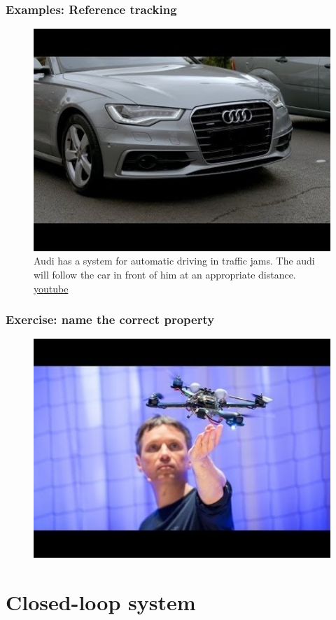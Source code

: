 \begin{frame}
	\frametitle{Examples: Reference tracking}
	\begin{figure}
\centering
\includegraphics[width=0.7\linewidth]{audi-tracking}
\caption{Audi has a system for automatic driving in traffic jams. The audi will follow the car in front of him at an appropriate distance. \href{https://www.youtube.com/watch?v=Qa_ZSRj0WM0}{youtube}}
\label{fig:audi-tracking}
\end{figure}
\end{frame}

\begin{frame}
	\frametitle{Exercise: name the correct property}
	\begin{figure}
\centering
\includegraphics[width=0.7\linewidth]{ted-drone}
\label{fig:ted-drone}
\end{figure}

\end{frame}


\section{Closed-loop system}

